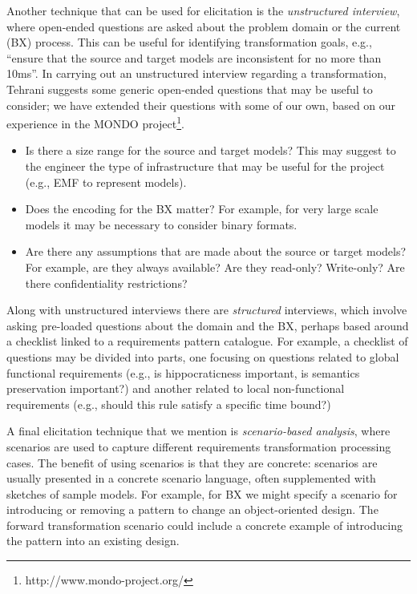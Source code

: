 Another technique that can be used for elicitation is the \textit{unstructured interview}, where open-ended questions are asked about the problem domain or the current (BX) process. This can be useful for identifying transformation goals, e.g., ``ensure that the source and target models are inconsistent for no more than 10ms''. In carrying out an unstructured interview regarding a transformation, Tehrani \cite{TehraniZL16} suggests some generic open-ended questions that may be useful to consider; we have extended their questions with some of our own, based on our experience in the MONDO project\footnote{http://www.mondo-project.org/}.
\begin{itemize}
\item Is there a size range for the source and target models? This may suggest to the engineer the type of infrastructure that may be useful for the project (e.g., EMF to represent models).

\item Does the encoding for the BX matter? For example, for very large scale models it may be necessary to consider binary formats.

\item Are there any assumptions that are made about the source or target models? For example, are they always available? Are they read-only? Write-only? Are there confidentiality restrictions?
\end{itemize}
Along with unstructured interviews there are \textit{structured} interviews, which involve asking pre-loaded questions about the domain and the BX, perhaps based around a checklist linked to a requirements pattern catalogue. For example, a checklist of questions may be divided into parts, one focusing on questions related to global functional requirements (e.g., is hippocraticness important, is semantics preservation important?) and another related to local non-functional requirements (e.g., should this rule satisfy a specific time bound?)

A final elicitation technique that we mention is \textit{scenario-based analysis}, where scenarios are used to capture different requirements transformation processing cases. The benefit of using scenarios is that they are concrete: scenarios are usually presented in a concrete scenario language, often supplemented with sketches of sample models. For example, for BX we might specify a scenario for introducing or removing a pattern to change an object-oriented design. The forward transformation scenario could include a concrete example of introducing the pattern into an existing design.

